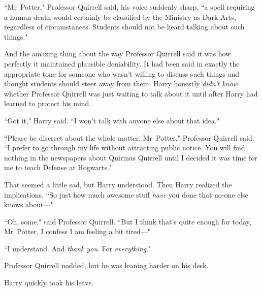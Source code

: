 ``Mr~Potter," Professor Quirrell said, his voice suddenly sharp, ``a spell requiring a human death would certainly be classified by the Ministry as Dark Arts, regardless of circumstances. Students should not be heard talking about such things."

And the amazing thing about the way Professor Quirrell said it was how perfectly it maintained plausible deniability. It had been said in exactly the appropriate tone for someone who wasn't willing to discuss such things and thought students should steer away from them. Harry honestly \emph{didn't know} whether Professor Quirrell was just waiting to talk about it until after Harry had learned to protect his mind.

``Got it," Harry said. ``I won't talk with anyone else about that idea."

``Please be discreet about the whole matter, Mr~Potter," Professor Quirrell said. ``I prefer to go through my life without attracting public notice. You will find nothing in the newspapers about Quirinus Quirrell until I decided it was time for me to teach Defense at Hogwarts."

That seemed a little sad, but Harry understood. Then Harry realized the implications. ``So just how much awesome stuff \emph{have} you done that no-one else knows about—"

``Oh, some," said Professor Quirrell. ``But I think that's quite enough for today, Mr~Potter, I confess I am feeling a bit tired—"

``I understand. And \emph{thank you}. For \emph{everything}."

Professor Quirrell nodded, but he was leaning harder on his desk.

Harry quickly took his leave.

